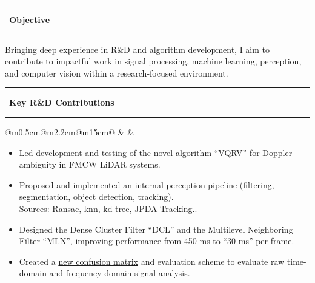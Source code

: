 \documentclass[10pt,a4paper]{article}
\newcommand{\sectionline}[1]{%
  \vspace{0.5em}
  \begin{center}
    \textcolor{title_color}{\rule[0.5ex]{0.25\linewidth}{0.5pt}}
    ~{\LARGE \bfseries \textcolor{title_color}{\cambria #1}}~
    \textcolor{title_color}{\rule[0.5ex]{0.25\linewidth}{0.5pt}}
  \end{center}
  \vspace{0.05em}
}
\begin{document}
\sectionline{Objective}
\textcolor{blocktext1_color}{Bringing deep experience in R\&D and algorithm development, I aim to contribute to impactful work in signal processing, machine learning, perception, and computer vision within a research-focused environment.}

\sectionline{Key R\&D Contributions}

\begin{tabular}{@{}m{0.5cm}@{\hspace{0.5em}}m{2.2cm}@{\hspace{0.5em}}m{15cm}@{}}
   & 
  \raisebox{1.8em}{\begin{minipage}[t]{\linewidth}
  \centering
    \textcolor{blocktitle1_color}{Sep. 21}\\
    \textcolor{blocktitle1_color}{Present}
  \end{minipage} 
  } &
\end{tabular}

\vspace{0.3em}
\begin{itemize}[leftmargin=*]
  \item Led development and testing of the novel algorithm \href{https://amr-aboughazala.super.site/doppler-ambiguity-solution}{“VQRV”} for Doppler ambiguity in FMCW LiDAR systems.
  \item Proposed and implemented an internal perception pipeline (filtering, segmentation, object detection, tracking).\\ {\fontsize{10pt}{10pt}\selectfont\textcolor{blocktext2_color}{Sources: Ransac, knn, kd-tree, JPDA Tracking.}}. 
  \item Designed the Dense Cluster Filter “DCL” and the Multilevel Neighboring Filter “MLN”, improving performance from 450 ms to \href{https://amr-aboughazala.super.site/real-time-filtering}{“30 ms”} per frame.
  \item Created a \href{https://amr-aboughazala.super.site/data-analysis}{new confusion matrix} and evaluation scheme to evaluate raw time-domain and frequency-domain signal analysis.
\end{itemize}
\end{document}
